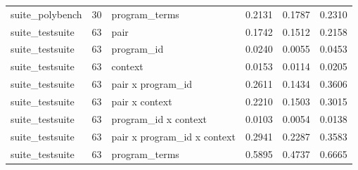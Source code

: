 \begin{table}[t]
\begin{tabular}{lrlrrr}
suite\_polybench & 30 & program\_terms & 0.2131 & 0.1787 & 0.2310 \\
suite\_testsuite & 63 & pair & 0.1742 & 0.1512 & 0.2158 \\
suite\_testsuite & 63 & program\_id & 0.0240 & 0.0055 & 0.0453 \\
suite\_testsuite & 63 & context & 0.0153 & 0.0114 & 0.0205 \\
suite\_testsuite & 63 & pair x program\_id & 0.2611 & 0.1434 & 0.3606 \\
suite\_testsuite & 63 & pair x context & 0.2210 & 0.1503 & 0.3015 \\
suite\_testsuite & 63 & program\_id x context & 0.0103 & 0.0054 & 0.0138 \\
suite\_testsuite & 63 & pair x program\_id x context & 0.2941 & 0.2287 & 0.3583 \\
suite\_testsuite & 63 & program\_terms & 0.5895 & 0.4737 & 0.6665 \\
\bottomrule
\end{tabular}
\end{table}
